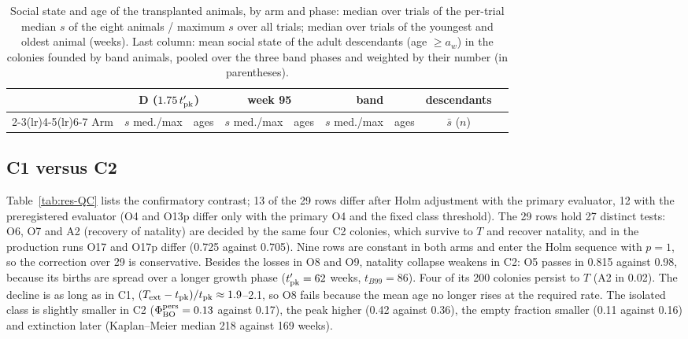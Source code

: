 \begin{table}[ht]
  \centering
  \caption{Social state and age of the transplanted animals, by arm and phase: median over trials of the per-trial
  median $s$ of the eight animals / maximum $s$ over all trials; median over trials of the youngest and oldest
  animal (weeks). Last column: mean social state of the adult descendants (age $\ge a_w$) in the colonies founded by
  band animals, pooled over the three band phases and weighted by their number (in parentheses).}
  \label{tab:res-trans-s}
  \scriptsize
  \setlength{\tabcolsep}{4pt}
  \begin{tabular}{@{}lcccccccc@{}}
    \toprule
    & \multicolumn{2}{c}{D ($1.75\,t'_{\rm pk}$)} & \multicolumn{2}{c}{week 95} & \multicolumn{2}{c}{band} & descendants \\
    \cmidrule(lr){2-3}\cmidrule(lr){4-5}\cmidrule(lr){6-7}
    Arm & $s$ med./max & ages & $s$ med./max & ages & $s$ med./max & ages & $\bar s$ ($n$) \\
    \midrule
    
  \end{tabular}
\end{table}

\subsection{\textsf{C1} versus \textsf{C2}}
\label{app:res-c1c2}

Table~\ref{tab:res-QC} lists the confirmatory contrast; 13 of the 29 rows differ after Holm adjustment with the
primary evaluator, 12 with the preregistered evaluator (O4 and O13p differ only with the primary O4 and the fixed class
threshold). The 29 rows hold 27 distinct tests: O6, O7 and A2 (recovery of natality) are decided by the same four \textsf{C2}
colonies, which survive to $T$ and recover natality, and in the production runs O17 and O17p differ (0.725 against 0.705). Nine rows are constant in both
arms and enter the Holm sequence with $p=1$, so the correction over 29 is conservative. Besides the losses in O8 and O9, natality collapse weakens in \textsf{C2}: O5 passes in 0.815 against
0.98, because its births are spread over a longer growth phase ($t'_{\rm pk}=62$ weeks, $t_{B99}=86$). Four of its
200 colonies persist to $T$ (A2 in 0.02). The decline is as long as in \textsf{C1}, $(T_{\rm ext}-t_{\rm pk})/t_{\rm
pk}\approx1.9$--2.1, so O8 fails because the mean age no longer rises at the required rate. The isolated class is
slightly smaller in \textsf{C2} ($\Phi^{\rm pers}_{\rm BO}=0.13$ against 0.17), the peak higher (0.42 against 0.36),
the empty fraction smaller (0.11 against 0.16) and extinction later (Kaplan--Meier median 218 against 169 weeks).

